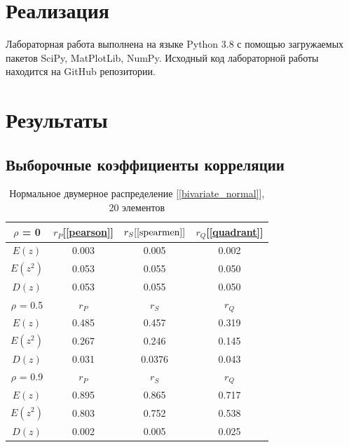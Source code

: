 \documentclass[12pt,a4paper]{article}
\begin{document}
	\newpage
	
	\section{Реализация}
		Лабораторная работа выполнена на языке Python 3.8 с помощью загружаемых пакетов SciPy, MatPlotLib, NumPy. Исходный код лабораторной работы находится на GitHub репозитории.
	\newpage
	
	\section{Результаты}
		\subsection{Выборочные коэффициенты корреляции}
		
			\begin{table}[htp]
			\label{coeffs_default_20}
				\begin{center}
					\begin{tabular}{|c|c|c|c|}
						\hline						
						$\rho$ = 0 & $r_P$[\ref{pearson}] & $r_S[\ref{spearmen}]$ & $r_Q$[\ref{quadrant}] \\ \hline
						$E(z)$ & 0.003 & 0.005 & 0.002 \\ \hline
						$E(z^2)$ & 0.053 & 0.055 & 0.050 \\ \hline
						$D(z)$ & 0.053 & 0.055 & 0.050 \\ \hline
						
						$\rho$ = 0.5 & $r_P$ & $r_S$ & $r_Q$ \\ \hline
						$E(z)$ & 0.485 & 0.457 & 0.319 \\ \hline
						$E(z^2)$ & 0.267 & 0.246 & 0.145 \\ \hline
						$D(z)$ & 0.031 & 0.0376 & 0.043 \\ \hline
						
						$\rho$ = 0.9 & $r_P$ & $r_S$ & $r_Q$ \\ \hline
						$E(z)$ & 0.895 & 0.865 & 0.717 \\ \hline
						$E(z^2)$ & 0.803 & 0.752 & 0.538 \\ \hline
						$D(z)$ & 0.002 & 0.005 & 0.025 \\ \hline
						
					\end{tabular}
				\end{center}
			\caption{Нормальное двумерное распределение [\ref{bivariate_normal}], 20 элементов}
			\end{table}
			\newpage
		
\end{document}
